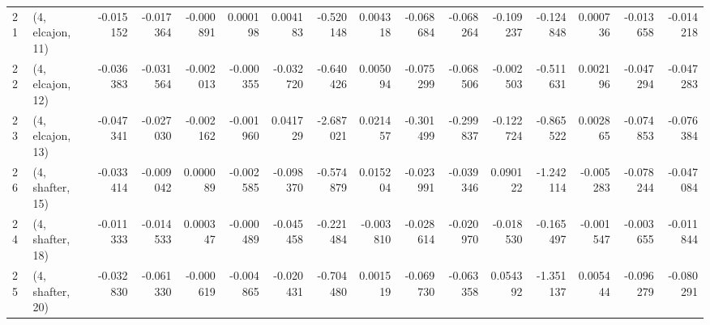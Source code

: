 \begin{tabular}{llrrrrrrrrrrrrrr}
21 &  (4, elcajon, 11) & -0.015152 & -0.017364 &  -0.000891 &  0.000198 &  0.004183 &  -0.520148 &  0.004318 &  -0.068684 & -0.068264 & -0.109237 &  -0.124848 &  0.000736 & -0.013658 & -0.014218 \\
22 &  (4, elcajon, 12) & -0.036383 & -0.031564 &  -0.002013 & -0.000355 & -0.032720 &  -0.640426 &  0.005094 &  -0.075299 & -0.068506 & -0.002503 &  -0.511631 &  0.002196 & -0.047294 & -0.047283 \\
23 &  (4, elcajon, 13) & -0.047341 & -0.027030 &  -0.002162 & -0.001960 &  0.041729 &  -2.687021 &  0.021457 &  -0.301499 & -0.299837 & -0.122724 &  -0.865522 &  0.002865 & -0.074853 & -0.076384 \\
26 &  (4, shafter, 15) & -0.033414 & -0.009042 &   0.000089 & -0.002585 & -0.098370 &  -0.574879 &  0.015204 &  -0.023991 & -0.039346 &  0.090122 &  -1.242114 & -0.005283 & -0.078244 & -0.047084 \\
24 &  (4, shafter, 18) & -0.011333 & -0.014533 &   0.000347 & -0.000489 & -0.045458 &  -0.221484 & -0.003810 &  -0.028614 & -0.020970 & -0.018530 &  -0.165497 & -0.001547 & -0.003655 & -0.011844 \\
25 &  (4, shafter, 20) & -0.032830 & -0.061330 &  -0.000619 & -0.004865 & -0.020431 &  -0.704480 &  0.001519 &  -0.069730 & -0.063358 &  0.054392 &  -1.351137 &  0.005444 & -0.096279 & -0.080291 \\
\bottomrule
\end{tabular}
